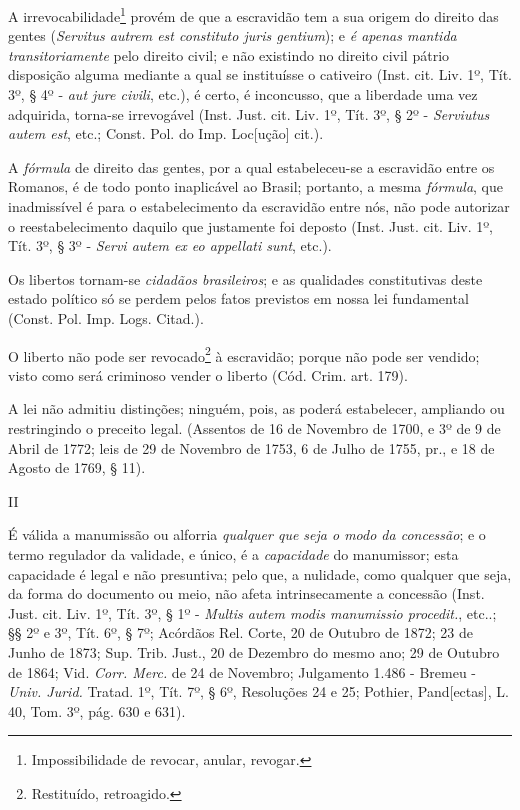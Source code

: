 A irrevocabilidade\footnote{Impossibilidade de revocar, anular, revogar.}
provém de que a escravidão tem a sua origem do direito das gentes
(\emph{Servitus autrem est constituto juris gentium}); e \emph{é apenas
mantida transitoriamente} pelo direito civil; e não existindo no direito
civil pátrio disposição alguma mediante a qual se instituísse o
cativeiro (Inst. cit. Liv. 1º, Tít. 3º, § 4º - \emph{aut jure civili},
etc.), é certo, é inconcusso, que a liberdade uma vez adquirida,
torna-se irrevogável (Inst. Just. cit. Liv. 1º, Tít. 3º, § 2º -
\emph{Serviutus autem est}, etc.; Const. Pol. do Imp. Loc{[}ução{]}
cit.).

A \emph{fórmula} de direito das gentes, por a qual estabeleceu-se a
escravidão entre os Romanos, é de todo ponto inaplicável ao Brasil;
portanto, a mesma \emph{fórmula}, que inadmissível é para o
estabelecimento da escravidão entre nós, não pode autorizar o
reestabelecimento daquilo que justamente foi deposto (Inst. Just. cit.
Liv. 1º, Tít. 3º, § 3º - \emph{Servi autem ex eo appellati sunt}, etc.).

Os libertos tornam-se \emph{cidadãos brasileiros}; e as qualidades
constitutivas deste estado político só se perdem pelos fatos previstos
em nossa lei fundamental (Const. Pol. Imp. Logs. Citad.).

O liberto não pode ser revocado\footnote{Restituído, retroagido.} à
escravidão; porque não pode ser vendido; visto como será criminoso
vender o liberto (Cód. Crim. art. 179).

A lei não admitiu distinções; ninguém, pois, as poderá estabelecer,
ampliando ou restringindo o preceito legal. (Assentos de 16 de Novembro
de 1700, e 3º de 9 de Abril de 1772; leis de 29 de Novembro de 1753, 6
de Julho de 1755, pr., e 18 de Agosto de 1769, § 11).

II

É válida a manumissão ou alforria \emph{qualquer que seja o modo da
concessão}; e o termo regulador da validade, e único, é a
\emph{capacidade} do manumissor; esta capacidade é legal e não
presuntiva; pelo que, a nulidade, como qualquer que seja, da forma do
documento ou meio, não afeta intrinsecamente a concessão (Inst. Just.
cit. Liv. 1º, Tít. 3º, § 1º - \emph{Multis autem modis manumissio
procedit.}, etc..; §§ 2º e 3º, Tít. 6º, § 7º; Acórdãos Rel. Corte, 20 de
Outubro de 1872; 23 de Junho de 1873; Sup. Trib. Just., 20 de Dezembro
do mesmo ano; 29 de Outubro de 1864; Vid. \emph{Corr. Merc.} de 24 de
Novembro; Julgamento 1.486 - Bremeu - \emph{Univ. Jurid.} Tratad. 1º,
Tít. 7º, § 6º, Resoluções 24 e 25; Pothier, Pand{[}ectas{]}, L. 40, Tom.
3º, pág. 630 e 631).

